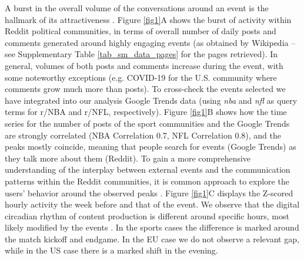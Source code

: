 \documentclass[fleqn,10pt]{wlscirep}
\begin{document}
A burst in the overall volume of the conversations around an event is the hallmark of its attractiveness \cite{wu2007novelty,sasahara2013quantifying}.
Figure \ref{fig1}A shows the burst of activity within Reddit political communities, in terms of overall number of daily posts and comments generated around highly engaging events (as obtained by Wikipedia --see Supplementary Table \ref{tab_sm_data_pages} for the pages retrieved).
In general, volumes of both posts and comments increase during the event, with some noteworthy exceptions (e.g. COVID-19 for the U.S. community where comments grow much more than posts). 
To cross-check the events selected we have integrated into our analysis Google Trends data (using \emph{nba} and \emph{nfl} as query terms for r/NBA and r/NFL, respectively).
Figure \ref{fig1}B shows how the time series for the number of posts of the sport communities and the Google Trends are strongly correlated (NBA Correlation 0.7, NFL Correlation 0.8), and the peaks mostly coincide, meaning that people search for events (Google Trends) as they talk more about them (Reddit).
To gain a more comprehensive understanding of the interplay between external events and the communication patterns within the Reddit communities, it is common approach to explore the users' behavior around the observed peaks \cite{he2017measuring,sasahara2013quantifying}.
Figure \ref{fig1}C displays the Z-scored hourly activity the week before and that of the event. 
We observe that the digital circadian rhythm of content production is different around specific hours, most likely modified by the events \cite{sasahara2013quantifying}. 
In the sports cases the difference is marked around the match kickoff and endgame.
In the EU case we do not observe a relevant gap, while in the US case there is a marked shift in the evening. 
%
\end{document}
